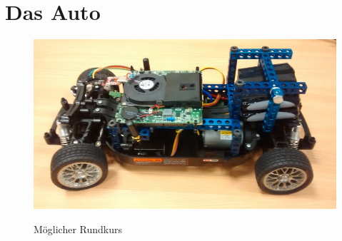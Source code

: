 \section{Das Auto}

\begin{figure}[H]
\centering
\includegraphics[width=.8\textwidth]{Auto.jpeg}\\
\caption{Möglicher Rundkurs \cite{website-carolo-cup-regelwerk}}
\label{fig:Auto}
\end{figure}